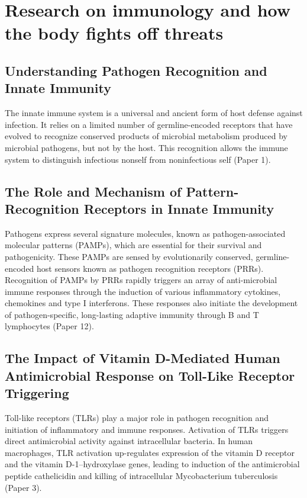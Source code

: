 \documentclass{article}
\begin{document}
\clearpage
\section{Research on immunology and how the body fights off threats}

\subsection{Understanding Pathogen Recognition and Innate Immunity}

The innate immune system is a universal and ancient form of host defense against infection. It relies on a limited number of germline-encoded receptors that have evolved to recognize conserved products of microbial metabolism produced by microbial pathogens, but not by the host. This recognition allows the immune system to distinguish infectious nonself from noninfectious self (Paper 1). 

\subsection{The Role and Mechanism of Pattern-Recognition Receptors in Innate Immunity}

Pathogens express several signature molecules, known as pathogen-associated molecular patterns (PAMPs), which are essential for their survival and pathogenicity. These PAMPs are sensed by evolutionarily conserved, germline-encoded host sensors known as pathogen recognition receptors (PRRs). Recognition of PAMPs by PRRs rapidly triggers an array of anti-microbial immune responses through the induction of various inflammatory cytokines, chemokines and type I interferons. These responses also initiate the development of pathogen-specific, long-lasting adaptive immunity through B and T lymphocytes (Paper 12).

\subsection{The Impact of Vitamin D-Mediated Human Antimicrobial Response on Toll-Like Receptor Triggering}

Toll-like receptors (TLRs) play a major role in pathogen recognition and initiation of inflammatory and immune responses. Activation of TLRs triggers direct antimicrobial activity against intracellular bacteria. In human macrophages, TLR activation up-regulates expression of the vitamin D receptor and the vitamin D-1–hydroxylase genes, leading to induction of the antimicrobial peptide cathelicidin and killing of intracellular Mycobacterium tuberculosis (Paper 3).
\end{document}
